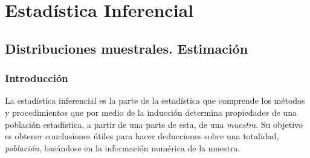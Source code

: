 
	
\part[Estadística Inferencial]{Estadística Inferencial\\[7ex]}



\chapter{Distribuciones muestrales. Estimación}





\section{Introducción}



La estadística inferencial es la parte de la estadística que comprende los métodos y procedimientos que por medio de la inducción determina propiedades de una población estadística, a partir de una parte de esta, de una \emph{muestra}. Su objetivo es obtener conclusiones útiles para hacer deducciones sobre una totalidad, \emph{población}, basándose en la información numérica de la muestra. 

